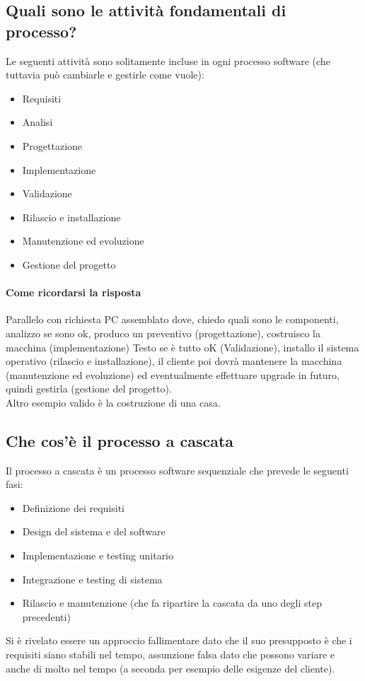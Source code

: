 \documentclass[12pt, a4paper, openany]{book}
\begin{document}
\subsection*{Quali sono le attività fondamentali di processo?}
Le seguenti attività sono solitamente incluse in ogni processo software (che tuttavia può cambiarle e gestirle come
vuole):
\begin{itemize}
    \item Requisiti
    \item Analisi
    \item Progettazione
    \item Implementazione
    \item Validazione
    \item Rilascio e installazione
    \item Manutenzione ed evoluzione
    \item Gestione del progetto
\end{itemize}
\paragraph*{Come ricordarsi la risposta}Parallelo con richiesta PC assemblato dove, chiedo quali sono le componenti,
analizzo se sono ok, produco un preventivo (progettazione), costruisco la macchina (implementazione)
Testo se è tutto oK (Validazione), installo il sistema operativo (rilascio e installazione), il cliente poi
dovrà mantenere la macchina (manutenzione ed evoluzione) ed eventualmente effettuare upgrade in futuro, quindi gestirla
(gestione del progetto).\\
Altro esempio valido è la costruzione di una casa.
\subsection*{Che cos'è il processo a cascata}
Il processo a cascata è un processo software sequenziale che prevede le seguenti fasi:
\begin{itemize}
    \item Definizione dei requisiti
    \item Design del sistema e del software
    \item Implementazione e testing unitario
    \item Integrazione e testing di sistema
    \item Rilascio e manutenzione (che fa ripartire la cascata da uno degli step precedenti)
\end{itemize}
Si è rivelato essere un approccio fallimentare dato che il suo presupposto è che i requisiti
siano stabili nel tempo, assunzione falsa dato che possono variare e anche di molto nel tempo (a
seconda per esempio delle esigenze del cliente).
\end{document}

